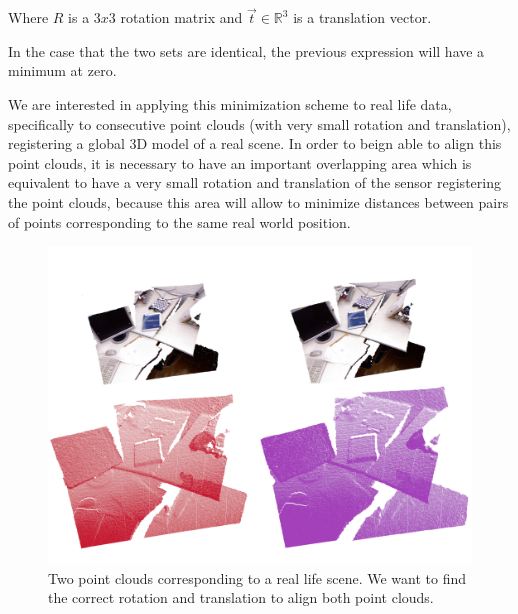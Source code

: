 Where $R$ is a  $3x3$ rotation matrix and $\vec{t} \in \mathbb{R}^3$ is a translation vector.


In the case that the two sets are identical, the previous expression will have a minimum at zero.

We are interested in applying this minimization scheme to real life data, specifically to consecutive 
point clouds (with very small rotation and translation), registering a global 3D model of 
a real scene. In order to beign able to align this point clouds, it is necessary to have an important overlapping 
area which is equivalent to have a very small rotation and translation of the sensor registering the point clouds, 
because this area will allow to minimize distances between pairs of points corresponding to the same real world position.


\begin{figure}[!h]
\begin{center}
\includegraphics[scale=0.35]{images/two_clouds}
\caption{Two point clouds corresponding to a real life scene. We want to find the correct rotation and translation to align both point clouds.}
\end{center}
\end{figure}

